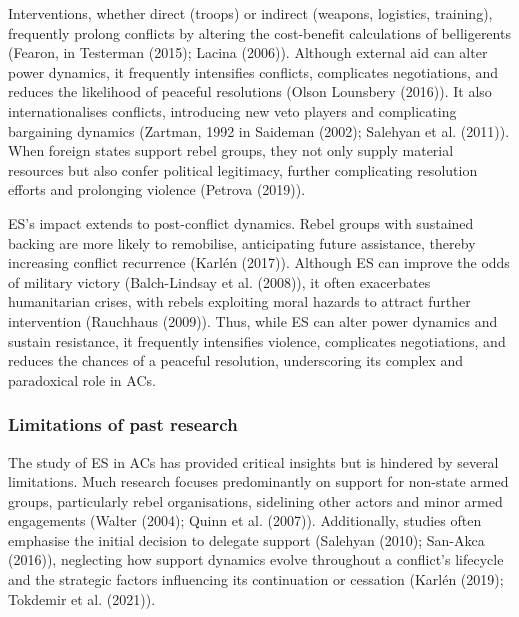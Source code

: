 \documentclass[
]{article}
\begin{document}
Interventions, whether direct (troops) or indirect (weapons, logistics,
training), frequently prolong conflicts by altering the cost-benefit
calculations of belligerents (Fearon, in Testerman (2015); Lacina
(2006)). Although external aid can alter power dynamics, it frequently
intensifies conflicts, complicates negotiations, and reduces the
likelihood of peaceful resolutions (Olson Lounsbery (2016)). It also
internationalises conflicts, introducing new veto players and
complicating bargaining dynamics (Zartman, 1992 in Saideman (2002);
Salehyan et al. (2011)). When foreign states support rebel groups, they
not only supply material resources but also confer political legitimacy,
further complicating resolution efforts and prolonging violence (Petrova
(2019)).

ES's impact extends to post-conflict dynamics. Rebel groups with
sustained backing are more likely to remobilise, anticipating future
assistance, thereby increasing conflict recurrence (Karlén (2017)).
Although ES can improve the odds of military victory (Balch-Lindsay et
al. (2008)), it often exacerbates humanitarian crises, with rebels
exploiting moral hazards to attract further intervention (Rauchhaus
(2009)). Thus, while ES can alter power dynamics and sustain resistance,
it frequently intensifies violence, complicates negotiations, and
reduces the chances of a peaceful resolution, underscoring its complex
and paradoxical role in ACs.

\subsubsection{Limitations of past
research}\label{limitations-of-past-research}

The study of ES in ACs has provided critical insights but is hindered by
several limitations. Much research focuses predominantly on support for
non-state armed groups, particularly rebel organisations, sidelining
other actors and minor armed engagements (Walter (2004); Quinn et al.
(2007)). Additionally, studies often emphasise the initial decision to
delegate support (Salehyan (2010); San-Akca (2016)), neglecting how
support dynamics evolve throughout a conflict's lifecycle and the
strategic factors influencing its continuation or cessation (Karlén
(2019); Tokdemir et al. (2021)).
\end{document}
